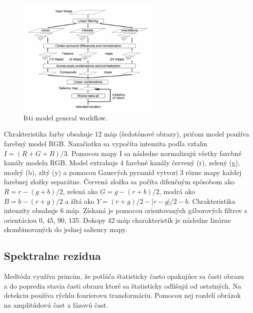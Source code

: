 \begin{figure}[H]
 \centering
 \includegraphics[width=7cm]{pics/itti-1.png}
 \caption{Itti model general workflow.}\label{wrap-fig:1}
\end{figure}
\vspace{10mm}

Chrakteristika farby obsahuje 12 máp (šedotónové obrazy), pričom model používa farebný model RGB.
Nazačiatku sa vypočíta intenzita podľa vzťahu \begin{math} I = (R+G+B)/3\end{math}.
Pomocou mapy I sa následne normalizujú všetky farebné kanály modelu RGB.
Model extrahuje 4 farebné kanály červený (r), zelený (g), modrý (b), zltý (y) a pomocou Gausvých pyramíd vytvorí 3 rôzne mapy každej farebnej zložky separátne.
Červená zložka sa počíta difenčným spôsobom ako \begin{math} R = r - (g + b)/2 \end{math}, zelená ako \begin{math} G = g - (r + b)/2 \end{math}, modrá ako \begin{math}B = b - (r + g)/2\end{math} a žltá ako \begin{math}Y = (r + g)/2 - |r - g|/2 - b\end{math}.
Chrakteristika intenzity obsahuje 6 máp.
Získaná je pomocou orientovaných gáborových filtrov s orientáciou 0\degree, 45\degree, 90\degree, 135\degree.
Dokopy 42 máp charakteristík je následne linárne skombinovaných do jednej saliency mapy\cite{itty-98}.


\subsection{Spektralne rezidua}
Medtóda využíva princím, že potláča štatisticky často opakujúce sa časti obrazu a do popredia stavia časti obrazu ktoré sa štatisticky odlišujú od ostatných.
Na detekciu používa rýchlu fourierovu transformáciu.
Pomocou nej rozdelí obrázok na amplitúdovú čast a fázovú čast.

